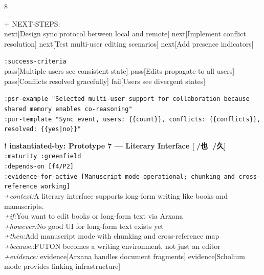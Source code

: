 \documentclass[landscape]{article}
\newcommand{\flexitag}[1]{\textcolor[gray]{0.35}{\textit{#1}}}
\newenvironment{devmapgreenfield}{%
  \def\FrameCommand{\colorbox{devmapgreenfieldbg}}%
  \setlength{\fboxsep}{2pt}%
  \MakeFramed{\advance\hsize-\width \FrameRestore}%
}{\endMakeFramed}
\begin{document}
\begin{paracol}{8}
\begin{devmapgreenfield}
\par
  + NEXT-STEPS:\\
    next[Design sync protocol between local and remote] next[Implement conflict resolution] next[Test multi-user editing scenarios] next[Add presence indicators]\\
\par
  \texttt{:\allowbreak{}success-\allowbreak{}criteria}\\
    pass[Multiple users see consistent state] pass[Edits propagate to all users] pass[Conflicts resolved gracefully] fail[Users see divergent states]\\
\par
  \texttt{:\allowbreak{}psr-\allowbreak{}example "Selected multi-\allowbreak{}user support for collaboration because shared memory enables co-\allowbreak{}reasoning"}\\
  \texttt{:\allowbreak{}pur-\allowbreak{}template "Sync event,\allowbreak{} users:\allowbreak{} \{\{count\}\},\allowbreak{} conflicts:\allowbreak{} \{\{conflicts\}\},\allowbreak{} resolved:\allowbreak{} \{\{yes|\allowbreak{}no\}\}"}\\
\par
\par
\end{devmapgreenfield}
\begin{devmapgreenfield}
\textbf{! instantiated-by: Prototype 7 — Literary Interface [🙅/也 💖/久]}\\
  \texttt{:\allowbreak{}maturity :\allowbreak{}greenfield}\\
  \texttt{:\allowbreak{}depends-\allowbreak{}on [f4/\allowbreak{}P2]}\\
  \texttt{:\allowbreak{}evidence-\allowbreak{}for-\allowbreak{}active [Manuscript mode operational;\allowbreak{} chunking and cross-\allowbreak{}reference working]}\\
  \flexitag{+context:}A literary interface supports long-form writing like books and manuscripts.\\
  \flexitag{+if:}You want to edit books or long-form text via Arxana\\
  \flexitag{+however:}No good UI for long-form text exists yet\\
  \flexitag{+then:}Add manuscript mode with chunking and cross-reference map\\
  \flexitag{+because:}FUTON becomes a writing environment, not just an editor\\
  \flexitag{+evidence:} evidence[Arxana handles document fragments] evidence[Scholium mode provides linking infrastructure]\\

\end{devmapgreenfield}
\end{paracol}
\end{document}
